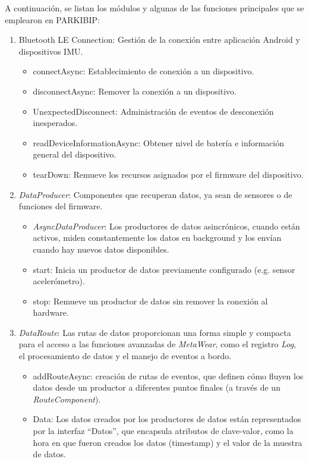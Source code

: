 A continuación, se listan los módulos y algunas de las funciones principales que se emplearon en PARKIBIP:

\begin{enumerate}
    \item Bluetooth LE Connection: Gestión de la conexión entre aplicación Android y dispositivos IMU. 
    \begin{itemize}
        \item connectAsync: Establecimiento de conexión a un dispositivo.
        \item disconnectAsync: Remover la conexión a un dispositivo.
        \item UnexpectedDisconnect: Administración de eventos de desconexión inesperados.
        \item readDeviceInformationAsync: Obtener nivel de batería e información general del dispositivo.
        \item tearDown: Remueve los recursos asignados por el firmware del dispositivo.
    \end{itemize}
    \item \textit{DataProducer}: Componentes que recuperan datos, ya sean de sensores o de funciones del firmware.
    \begin{itemize}
        \item \textit{AsyncDataProducer}: Los productores de datos asincrónicos, cuando están activos, miden constantemente los datos en \gls{background} y los envían cuando hay nuevos datos disponibles.
        \item start: Inicia un productor de datos previamente configurado (e.g. sensor acelerómetro).
        \item stop: Remueve un productor de datos sin remover la conexión al hardware.
    \end{itemize}
    \item \textit{DataRoute}: Las rutas de datos proporcionan una forma simple y compacta para el acceso a las funciones avanzadas de \textit{MetaWear}, como el registro \textit{Log}, el procesamiento de datos y el manejo de eventos a bordo.
    \begin{itemize}
        \item addRouteAsync: creación de rutas de eventos, que definen cómo fluyen los datos desde un productor a diferentes puntos finales (a través de un \textit{RouteComponent}).
        \item Data: Los datos creados por los productores de datos están representados por la interfaz ``Datos'', que encapsula atributos de clave-valor, como la hora en que fueron creados los datos (timestamp) y el valor de la muestra de datos.

\end{itemize}
\end{enumerate}
